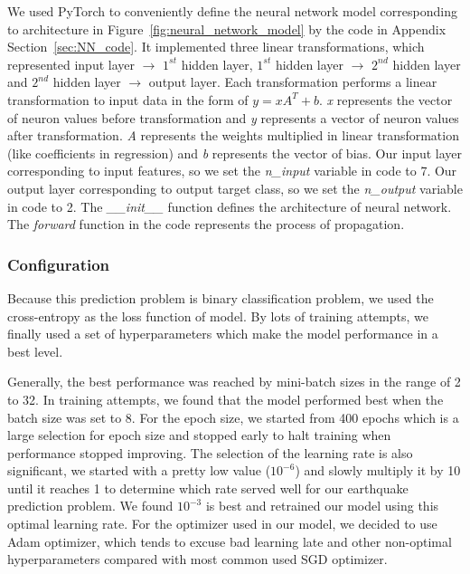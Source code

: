 \documentclass[final-report]{report-template}
\begin{document}
We used PyTorch to conveniently define the neural network model corresponding to architecture in Figure~\ref{fig:neural_network_model} by the code in Appendix Section~\ref{sec:NN_code}.
It implemented three linear transformations, which represented input layer $\rightarrow$ $1^{st}$ hidden layer, $1^{st}$ hidden layer $\rightarrow$ $2^{nd}$ hidden layer and $2^{nd}$ hidden layer $\rightarrow$ output layer.
Each transformation performs a linear transformation to input data in the form of $y = xA^{T} + b$. \textit{x} represents the vector of neuron values before transformation and \textit{y} represents a vector of neuron values after transformation.
\textit{A} represents the weights multiplied in linear transformation (like coefficients in regression) and \textit{b} represents the vector of bias. 
Our input layer corresponding to input features, so we set the \textit{n\_input} variable in code to 7. 
Our output layer corresponding to output target class, so we set the \textit{n\_output} variable in code to 2.
The \textit{\_\_init\_\_} function defines the architecture of neural network. The \textit{forward} function in the code represents the process of propagation.


\subsubsection{Configuration}
Because this prediction problem is binary classification problem, we used the cross-entropy \citep{de2005tutorial} as the loss function of model.
By lots of training attempts, we finally used a set of hyperparameters which make the model performance in a best level.

Generally, the best performance was reached by mini-batch sizes in the range of 2 to 32. In training attempts, we found that the model performed best when the batch size was set to 8.
For the epoch size, we started from 400 epochs which is a large selection for epoch size and stopped early to halt training when performance stopped improving.
The selection of the learning rate is also significant, we started with a pretty low value ($10^{-6}$) and slowly multiply it by 10 until it reaches 1 to determine which rate served well for our earthquake prediction problem. 
We found $10^{-3}$ is best and retrained our model using this optimal learning rate.
For the optimizer used in our model, we decided to use Adam optimizer, which tends to excuse bad learning late and other non-optimal hyperparameters compared with most common used SGD optimizer.
\end{document}
